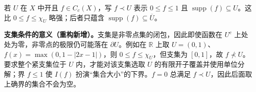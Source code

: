 \documentclass[../../main.tex]{subfiles}
\begin{document}
\begin{definition}[记号 $f\prec U$]\label{definition:ch07-subordinate-function}
若 $U$ 在 $X$ 中开且 $f\in C_c(X)$，写 $f\prec U$ 表示 $0\leqslant f\leqslant1$ 且 $\operatorname{supp}(f)\subseteq U$。这比 $0\leqslant f\leqslant\chi_U$ 略强；后者只蕴含 $\operatorname{supp}(f)\subseteq\overline U$。
\end{definition}
\begin{remark}
\textbf{支集条件的意义（重构新增）。}支集是非零点集的闭包，因此即使函数在 $U^c$ 上处处为零，非零点的极限仍可能落在 $\partial U$。例如在 $\mathbb R$ 上取 $U=(0,1)$、$f(x)=\max(0,1-|2x-1|)$，则 $0\leqslant f\leqslant\chi_U$，但支集为 $[0,1]$，故 $f\not\prec U$。要求整个紧支集位于 $U$ 内，才能对该支集选取 $U$ 的有限开子覆盖并使用单位分解；界 $f\leqslant1$ 使 $I(f)$ 扮演“集合大小”的下界。$f=0$ 总满足 $f\prec U$，因此后面取上确界的集合不会为空。
\end{remark}


\end{document}
